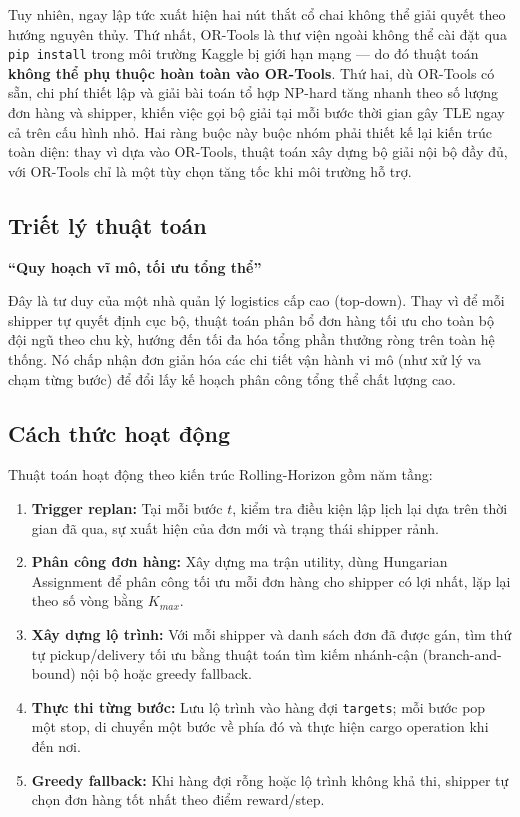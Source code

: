 \documentclass[conference]{IEEEtran}
\begin{document}
Tuy nhiên, ngay lập tức xuất hiện hai nút thắt cổ chai không thể giải quyết theo hướng nguyên thủy. Thứ nhất, OR-Tools là thư viện ngoài không thể cài đặt qua \texttt{pip install} trong môi trường Kaggle bị giới hạn mạng --- do đó thuật toán \textbf{không thể phụ thuộc hoàn toàn vào OR-Tools}. Thứ hai, dù OR-Tools có sẵn, chi phí thiết lập và giải bài toán tổ hợp NP-hard tăng nhanh theo số lượng đơn hàng và shipper, khiến việc gọi bộ giải tại mỗi bước thời gian gây TLE ngay cả trên cấu hình nhỏ. Hai ràng buộc này buộc nhóm phải thiết kế lại kiến trúc toàn diện: thay vì dựa vào OR-Tools, thuật toán xây dựng bộ giải nội bộ đầy đủ, với OR-Tools chỉ là một tùy chọn tăng tốc khi môi trường hỗ trợ.
 
\subsection{Triết lý thuật toán}
\begin{center}
    \textbf{``Quy hoạch vĩ mô, tối ưu tổng thể''}
\end{center}
 
Đây là tư duy của một nhà quản lý logistics cấp cao (top-down). Thay vì để mỗi shipper tự quyết định cục bộ, thuật toán phân bổ đơn hàng tối ưu cho toàn bộ đội ngũ theo chu kỳ, hướng đến tối đa hóa tổng phần thưởng ròng trên toàn hệ thống. Nó chấp nhận đơn giản hóa các chi tiết vận hành vi mô (như xử lý va chạm từng bước) để đổi lấy kế hoạch phân công tổng thể chất lượng cao.
 
\subsection{Cách thức hoạt động}
Thuật toán hoạt động theo kiến trúc Rolling-Horizon gồm năm tầng:
\begin{enumerate}
    \item \textbf{Trigger replan:} Tại mỗi bước $t$, kiểm tra điều kiện lập lịch lại dựa trên thời gian đã qua, sự xuất hiện của đơn mới và trạng thái shipper rảnh.
    \item \textbf{Phân công đơn hàng:} Xây dựng ma trận utility, dùng Hungarian Assignment để phân công tối ưu mỗi đơn hàng cho shipper có lợi nhất, lặp lại theo số vòng bằng $K_{max}$.
    \item \textbf{Xây dựng lộ trình:} Với mỗi shipper và danh sách đơn đã được gán, tìm thứ tự pickup/delivery tối ưu bằng thuật toán tìm kiếm nhánh-cận (branch-and-bound) nội bộ hoặc greedy fallback.
    \item \textbf{Thực thi từng bước:} Lưu lộ trình vào hàng đợi \texttt{targets}; mỗi bước pop một stop, di chuyển một bước về phía đó và thực hiện cargo operation khi đến nơi.
    \item \textbf{Greedy fallback:} Khi hàng đợi rỗng hoặc lộ trình không khả thi, shipper tự chọn đơn hàng tốt nhất theo điểm reward/step.
\end{enumerate}
 
\end{document}
